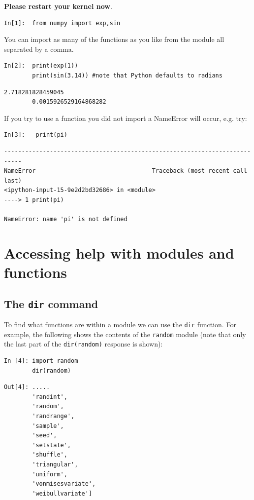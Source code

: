 \noindent \textbf{Please restart your kernel now}.
\begin{lstlisting}[style=PY]
In[1]:  from numpy import exp,sin
\end{lstlisting}
You can import as many of the functions as you like from the module all separated by a comma. 
\begin{lstlisting}[style=PY]
In[2]:  print(exp(1))
        print(sin(3.14)) #note that Python defaults to radians
\end{lstlisting}
\begin{lstlisting}[style=PY_out]
        2.718281828459045
        0.0015926529164868282
\end{lstlisting}
\vspace*{1ex}
\noindent If you try to use a function you did not import a NameError will occur, e.g. try:
\begin{lstlisting}[style=PY]
In[3]:   print(pi)
\end{lstlisting}
\begin{lstlisting}[style=PY_out]
---------------------------------------------------------------------------
NameError                                 Traceback (most recent call last)
<ipython-input-15-9e2d2bd32686> in <module>
----> 1 print(pi)

NameError: name 'pi' is not defined
\end{lstlisting}

\newpage

\section{Accessing help with modules and functions}

\subsection{The {\tt dir} command}

To find what functions are within a module we can use the {\tt dir} function. For example, the following shows the contents of the {\tt random} module (note that only the last part of the {\tt dir(random)} response is shown):   
\begin{lstlisting}[style=PY]
In [4]: import random
        dir(random)
\end{lstlisting}
\begin{lstlisting}[style=PY_out]
Out[4]: .....
        'randint',
        'random',
        'randrange',
        'sample',
        'seed',
        'setstate',
        'shuffle',
        'triangular',
        'uniform',
        'vonmisesvariate',
        'weibullvariate']
\end{lstlisting}

